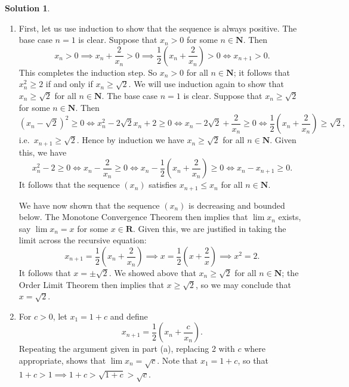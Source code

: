 \documentclass[12pt]{article}
\theoremstyle{definition}
\theoremstyle{exercise}
\theoremstyle{solution}
\newtheorem*{solution}{Solution}
\newcommand{\N}{\mathbf{N}}
\newcommand{\R}{\mathbf{R}}
\begin{document}
\begin{solution}
    \begin{enumerate}
        \item First, let us use induction to show that the sequence is always positive. The base case \( n = 1 \) is clear. Suppose that \( x_n > 0 \) for some \( n \in \N \). Then
        \[
            x_n > 0 \implies x_n + \frac{2}{x_n} > 0 \implies \frac{1}{2} \left( x_n + \frac{2}{x_n} \right) > 0 \iff x_{n+1} > 0.
        \]
        This completes the induction step. So \( x_n > 0 \) for all \( n \in \N \); it follows that \( x_n^2 \geq 2 \) if and only if \( x_n \geq \sqrt{2} \). We will use induction again to show that \( x_n \geq \sqrt{2} \) for all \( n \in \N \). The base case \( n = 1 \) is clear. Suppose that \( x_n \geq \sqrt{2} \) for some \( n \in \N \). Then
        \[
            (x_n - \sqrt{2})^2 \geq 0 \iff x_n^2 - 2 \sqrt{2} x_n + 2 \geq 0 \iff x_n - 2 \sqrt{2} + \frac{2}{x_n} \geq 0 \iff \frac{1}{2} \left( x_n + \frac{2}{x_n} \right) \geq \sqrt{2},
        \]
        i.e.\ \( x_{n+1} \geq \sqrt{2} \). Hence by induction we have \( x_n \geq \sqrt {2} \) for all \( n \in \N \). Given this, we have
        \[
            x_n^2 - 2 \geq 0 \iff x_n - \frac{2}{x_n} \geq 0 \iff x_n - \frac{1}{2} \left( x_n + \frac{2}{x_n} \right) \geq 0 \iff x_n - x_{n+1} \geq 0.
        \]
        It follows that the sequence \( (x_n) \) satisfies \( x_{n+1} \leq x_n \) for all \( n \in \N \).

        We have now shown that the sequence \( (x_n) \) is decreasing and bounded below. The Monotone Convergence Theorem then implies that \( \lim x_n \) exists, say \( \lim x_n = x \) for some \( x \in \R \). Given this, we are justified in taking the limit across the recursive equation:
        \[
            x_{n+1} = \frac{1}{2} \left( x_n + \frac{2}{x_n} \right) \implies x = \frac{1}{2} \left( x + \frac{2}{x} \right) \implies x^2 = 2.
        \]
        It follows that \( x = \pm \sqrt{2} \). We showed above that \( x_n \geq \sqrt{2} \) for all \( n \in \N \); the Order Limit Theorem then implies that \( x \geq \sqrt{2} \), so we may conclude that \( x = \sqrt{2} \).

        \item For \( c > 0 \), let \( x_1 = 1 + c \) and define
        \[
            x_{n+1} = \frac{1}{2} \left( x_n + \frac{c}{x_n} \right).
        \]
        Repeating the argument given in part (a), replacing 2 with \( c \) where appropriate, shows that \( \lim x_n = \sqrt{c} \). Note that \( x_1 = 1 + c \), so that \( 1 + c > 1 \implies 1 + c > \sqrt{1 + c} > \sqrt{c} \).
    \end{enumerate}
\end{solution}
\end{document}
